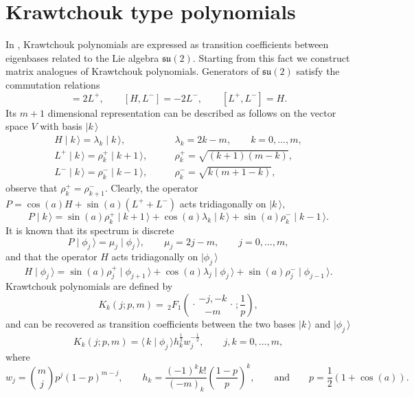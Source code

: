 \documentclass[a4paper,reqno]{amsart}
\newcommand{\rFs}[5]{\,_{#1}F_{#2} \left( \genfrac{.}{.}{0pt}{}{#3}{#4};#5 \right)}
\theoremstyle{definition}
\numberwithin{equation}{section}
\newcommand{\bra}[1]{\langle\,{#1}}
\newcommand{\ket}[1]{\mid{#1}\,\rangle}
\begin{document}


\section{Krawtchouk type polynomials}
In \cite{GranovskiiZhedanov86}, Krawtchouk polynomials are expressed as transition coefficients between eigenbases related to the Lie algebra $\mathfrak{su}(2)$. Starting from this fact we construct matrix analogues of Krawtchouk polynomials. Generators of $\mathfrak{su}(2)$ satisfy the commutation relations
\begin{equation}
    [H,L^+]=2L^+,\qquad [H,L^-]=-2L^-,\qquad [L^+,L^-]=H.
\end{equation}
Its $m+1$ dimensional representation can be described as follows on the vector space $V$ with basis $\ket{k}$
\begin{align}
H \ket{k}=\lambda_k\ket{k},&\qquad \lambda_k=2k-m,\qquad k=0,\ldots,m, \\
L^{+} \ket{k}=\rho^+_k\ket{k+1},&\qquad \rho^+_k=\sqrt{(k+1)(m-k)},\\
L^{-} \ket{k}=\rho^-_k\ket{k-1},&\qquad \rho^-_k=\sqrt{k(m+1-k)},
\end{align}
observe that $\rho_k^+=\rho_{k+1}^-.$ Clearly, the operator $P=\cos(a)H+\sin(a)(L^++L^-)$ acts tridiagonally on $\ket{k},$ 
\begin{equation}
    P\ket{k}=\sin(a) \rho_k^+ \ket{k+1}+ \cos(a)\lambda_k\ket{k}+\sin(a)\rho_k^-\ket{k-1}.
\end{equation}
It is known that its spectrum is discrete 
\begin{equation}
\label{eq:spectrum-P}
P\ket{\phi_j}=\mu_j\ket{\phi_j},\qquad \mu_j=2j-m,\qquad j=0,\ldots,m, 
\end{equation}
and that the operator $H$ acts tridiagonally on $\ket{\phi_j}$
\begin{equation}
    H \ket{\phi_j}=\sin(a)\rho^+_j\ket{\phi_{j+1}}+\cos(a)\lambda_j\ket{\phi_j}+\sin(a)\rho^-_{j}\ket{\phi_{j-1}}.
\end{equation}
Krawtchouk polynomials are defined by
\begin{equation}
K_{k}(j;p,m)=\rFs{2}{1}{-j,-k}{-m}{\frac{1}{p}},
\end{equation}
and can be recovered as transition coefficients between the two bases $\ket{k}$ and $\ket{\phi_j}$
\begin{equation}
\label{eq:scalar-krawtch-transition-coeff}
K_{k}(j;p,m)=\bra{k}\ket{\phi_j}h_k^\frac12 w_j^{-\frac{1}{2}},\qquad j,k=0,\ldots,m,
\end{equation}
where
\begin{equation}
\label{eq:weight-norm-scalar-krawt}
w_j=\binom{m}{j}p^j(1-p)^{m-j}, \qquad h_k=\frac{(-1)^kk!}{(-m)_k}\left(\frac{1-p}{p}\right)^k, \qquad \text{and}\qquad p=\frac{1}{2}(1+\cos(a)).
\end{equation}
\end{document}
